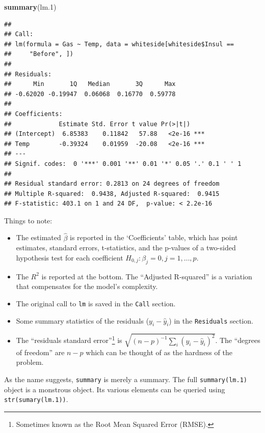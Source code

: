 \documentclass[]{book}
\newenvironment{Shaded}{\begin{snugshade}}{\end{snugshade}}
\newcommand{\KeywordTok}[1]{\textcolor[rgb]{0.13,0.29,0.53}{\textbf{{#1}}}}
\newcommand{\FloatTok}[1]{\textcolor[rgb]{0.00,0.00,0.81}{{#1}}}
\newcommand{\NormalTok}[1]{{#1}}
\providecommand{\tightlist}{%
  \setlength{\itemsep}{0pt}\setlength{\parskip}{0pt}}
\theoremstyle{definition}
\theoremstyle{definition}
\theoremstyle{remark}
\begin{document}
\begin{Shaded}
\begin{Highlighting}[]
\KeywordTok{summary}\NormalTok{(lm}\FloatTok{.1}\NormalTok{)}
\end{Highlighting}
\end{Shaded}

\begin{verbatim}
## 
## Call:
## lm(formula = Gas ~ Temp, data = whiteside[whiteside$Insul == 
##     "Before", ])
## 
## Residuals:
##      Min       1Q   Median       3Q      Max 
## -0.62020 -0.19947  0.06068  0.16770  0.59778 
## 
## Coefficients:
##             Estimate Std. Error t value Pr(>|t|)    
## (Intercept)  6.85383    0.11842   57.88   <2e-16 ***
## Temp        -0.39324    0.01959  -20.08   <2e-16 ***
## ---
## Signif. codes:  0 '***' 0.001 '**' 0.01 '*' 0.05 '.' 0.1 ' ' 1
## 
## Residual standard error: 0.2813 on 24 degrees of freedom
## Multiple R-squared:  0.9438, Adjusted R-squared:  0.9415 
## F-statistic: 403.1 on 1 and 24 DF,  p-value: < 2.2e-16
\end{verbatim}

Things to note:

\begin{itemize}
\tightlist
\item
  The estimated \(\hat \beta\) is reported in the `Coefficients' table,
  which has point estimates, standard errors, t-statistics, and the
  p-values of a two-sided hypothesis test for each coefficient
  \(H_{0,j}:\beta_j=0, j=1,\dots,p\).
\item
  The \(R^2\) is reported at the bottom. The ``Adjusted R-squared'' is a
  variation that compensates for the model's complexity.
\item
  The original call to \texttt{lm} is saved in the \texttt{Call}
  section.
\item
  Some summary statistics of the residuals (\(y_i-\hat y_i\)) in the
  \texttt{Residuals} section.
\item
  The ``residuals standard error''\footnote{Sometimes known as the Root
    Mean Squared Error (RMSE).} is
  \(\sqrt{(n-p)^{-1} \sum_i (y_i-\hat y_i)^2}\). The ``degrees of
  freedom'' are \(n-p\) which can be thought of as the hardness of the
  problem.
\end{itemize}

As the name suggests, \texttt{summary} is merely a summary. The full
\texttt{summary(lm.1)} object is a monstrous object. Its various
elements can be queried using \texttt{str(sumary(lm.1))}.
\end{document}
